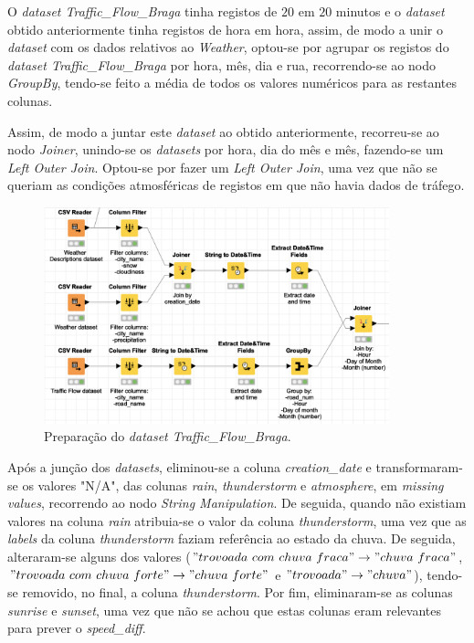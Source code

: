 \documentclass[a4paper, 12pt]{article}
\begin{document}
O \textit{dataset Traffic\_Flow\_Braga} tinha registos de $20$ em $20$ minutos e o \textit{dataset} obtido anteriormente tinha registos de hora em hora, assim, de modo a unir o \textit{dataset} com os dados relativos ao \textit{Weather}, optou-se por agrupar os registos do \textit{dataset Traffic\_Flow\_Braga} por hora, mês, dia e rua, recorrendo-se ao nodo \textit{GroupBy}, tendo-se feito a média de todos os valores numéricos para as restantes colunas.

Assim, de modo a juntar este \textit{dataset} ao obtido anteriormente, recorreu-se ao nodo \textit{Joiner}, unindo-se os \textit{datasets} por hora, dia do mês e mês, fazendo-se um \textit{Left Outer Join}. Optou-se por fazer um \textit{Left Outer Join}, uma vez que não se queriam as condições atmosféricas de registos em que não havia dados de tráfego.

\begin{figure}[H]
	\centering
	\includegraphics[width=10cm]{join}
	\caption{Preparação do \textit{dataset Traffic\_Flow\_Braga}.}
\end{figure}

Após a junção dos \textit{datasets}, eliminou-se a coluna \textit{creation\_date} e transformaram-se os valores "N/A", das colunas \textit{rain}, \textit{thunderstorm} e \textit{atmosphere}, em \textit{missing values}, recorrendo ao nodo \textit{String Manipulation}. De seguida, quando não existiam valores na coluna \textit{rain} atribuia-se o valor da coluna \textit{thunderstorm}, uma vez que as \textit{labels} da coluna \textit{thunderstorm} faziam referência ao estado da chuva. De seguida, alteraram-se alguns dos valores ($"trovoada \ com \ chuva \ fraca" \rightarrow "chuva \ fraca"$, $"trovoada \ com \ chuva \ forte" \rightarrow "chuva \ forte"$ e $"trovoada" \rightarrow "chuva"$), tendo-se removido, no final, a coluna \textit{thunderstorm}. Por fim, eliminaram-se as colunas \textit{sunrise} e \textit{sunset}, uma vez que não se achou que estas colunas eram relevantes para prever o \textit{speed\_diff}.
\end{document}

